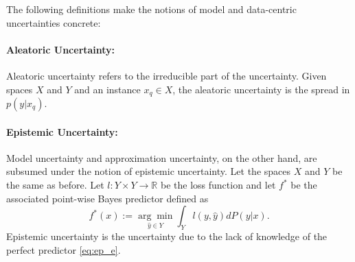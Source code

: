 \documentclass[10pt]{article} %
\theoremstyle{definition}
\begin{document}
The following definitions make the notions of model and data-centric uncertainties concrete:

 \paragraph{Aleatoric Uncertainty:} Aleatoric uncertainty refers to the irreducible part of the uncertainty. Given spaces $X$ and $Y$ and an instance $x_q \in X$, the aleatoric uncertainty is the spread in $p(y|x_q)$.
 \paragraph{Epistemic Uncertainty:} Model uncertainty and approximation uncertainty, on the other hand, are subsumed under the notion of epistemic uncertainty. Let the spaces $X$ and $Y$ be the same as before. Let $l: Y \times Y \to \mathbb{R}$ be the loss function and let $f^*$ be the associated point-wise Bayes predictor defined as \begin{equation}
f^*(x) := \underset{\hat{y} \in Y}{\arg \min} \int_{Y}l(y, \hat{y})dP(y|x). \label{eq:ep_e}
\end{equation} Epistemic uncertainty is the uncertainty due to the lack of knowledge of the perfect predictor \cref{eq:ep_e}.
\end{document}
